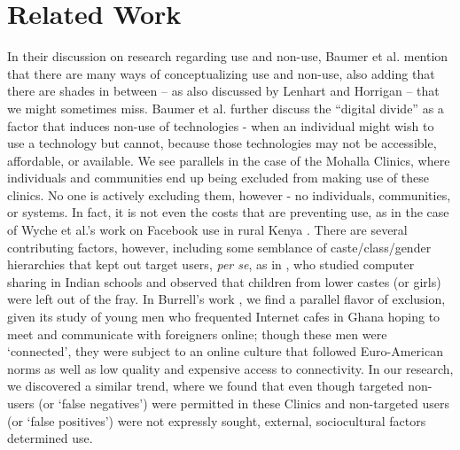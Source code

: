 \section{Related Work}


In their discussion on research regarding use and non-use, Baumer et al. \cite{Baumer:2015:USE:2702123.2702147} mention that there are many ways of conceptualizing use and non-use, also adding that there are shades in between – as also discussed by Lenhart and Horrigan \cite{2003} – that we might sometimes miss. Baumer et al. \cite{2015} further discuss the ``digital divide'' \cite{Keniston2003} as a factor that induces non-use of technologies - when an individual might wish to use a technology but cannot, because those technologies may not be accessible, affordable, or available. We see parallels in the case of the Mohalla Clinics, where individuals and communities end up being excluded from making use of these clinics. No one is actively excluding them, however - no individuals, communities, or systems. In fact, it is not even the costs that are preventing use, as in the case of Wyche et al.'s work on Facebook use in rural Kenya \cite{2013}. There are several contributing factors, however, including some semblance of caste/class/gender hierarchies that kept out target users, \textit{per se}, as in \cite{Patra2007}, who studied computer sharing in Indian schools and observed that children from lower castes (or girls) were left out of the fray. In Burrell's work \cite{2012}, we find a parallel flavor of exclusion, given its study of young men who frequented Internet cafes in Ghana hoping to meet and communicate with foreigners online; though these men were `connected’, they were subject to an online culture that followed Euro-American norms as well as low quality and expensive access to connectivity. In our research, we discovered a similar trend, where we found that even though targeted non-users (or `false negatives') were permitted in these Clinics and non-targeted users (or `false positives') were not expressly sought, external, sociocultural factors determined use. 